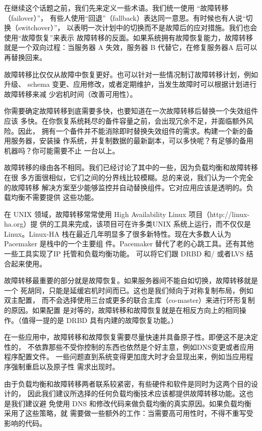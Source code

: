 在继续这个话题之前，我们先来定义一些术语。我们统一使用 “故障转移（failover）”，
有些人使用“回退”（fallback）表达同一意思。有时候也有人说“切换（switchover）”，
以表明一次计划中的切换而不是故障后的应对措施。我们也会使用“故障恢复”来表示
故障转移的反面。如果系统拥有故障恢复能力，故障转移就是一个双向过程：当服务器
A 失效，服务器 B 代替它，在修复服务器A 后可以再替换回来。

故障转移比仅仅从故障中恢复更好。也可以针对一些情况制订故障转移计划，例如升级、
schema 变更、应用修改，或者定期维护，当发生故障时可以根据计划进行故障转移来减
少宕机时间（改善可用性）。

你需要确定故障转移到底需要多快，也要知道在一次故障转移后替换一个失效组件应该
多快。在你恢复系统耗尽的备件容量之前，会出现冗余不足，并面临额外风险。因此，
拥有一个备件并不能消除即时替换失效组件的需求。构建一个新的备用服务器，安装操
作系统，并复制数据的最新副本，可以多快呢？有足够的备用机器吗？你可能需要不止
一台以上。

故障转移的缘由各不相同。我们已经讨论了其中的一些，因为负载均衡和故障转移在很
多方面很相似，它们之间的分界线比较模糊。总的来说，我们认为一个完全的故障转移
解决方案至少能够监控并自动替换组件。它对应用应该是透明的。负载均衡不需要提供
这些功能。

在 UNIX 领域，故障转移常常使用 High Availability Linux 项目（http://linux-ha.org）提
供的工具来完成，该项目可在许多类UNIX 系统上运行，而不仅仅是Linux。Linux-HA
栈在最近几年明显多了很多新特性。现在大多数人认为 Pacemaker 是栈中的一个主要组
件。Pacemaker 替代了老的心跳工具。还有其他一些工具实现了IP 托管和负载均衡功能。
可以将它们跟 DRBD 和/ 或者LVS 结合起来使用。

故障转移最重要的部分就是故障恢复。如果服务器间不能自如切换，故障转移就是一个
死胡同，只能是延缓宕机时间而已。这也是我们倾向于对称复制布局，例如双主配置，
而不会选择使用三台或更多的联合主库（co-master）来进行环形复制的原因。如果配置
是对等的，故障转移和故障恢复就是在相反方向上的相同操作。（值得一提的是 DRBD
具有内建的故障恢复功能。）

在一些应用中，故障转移和故障恢复需要尽量快速并具备原子性。即便这不是决定性的，
不依靠那些不受你控制的东西也依然是个好主意，例如DNS变更或者应用程序配置文件。
一些问题直到系统变得更加庞大时才会显现出来，例如当应用程序强制重启以及原子性
需求出现时。

由于负载均衡和故障转移两者联系较紧密，有些硬件和软件是同时为这两个目的设计的，
因此我们建议所选择的任何负载均衡技术应该都提供故障转移功能。这也是我们建议避
免使用 DNS 和修改代码来做负载均衡的真实原因。如果负载均衡采用了这些策略，就
需要做一些额外的工作：当需要高可用性时，不得不重写受影响的代码。

